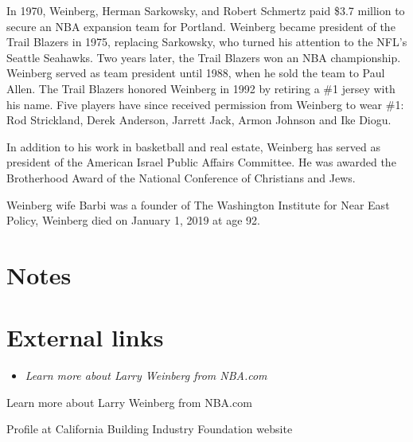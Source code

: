 In 1970, Weinberg, Herman Sarkowsky, and Robert Schmertz paid \$3.7
million to secure an NBA expansion team for Portland. Weinberg became
president of the Trail Blazers in 1975, replacing Sarkowsky, who turned
his attention to the NFL's Seattle Seahawks. Two years later, the Trail
Blazers won an NBA championship. Weinberg served as team president until
1988, when he sold the team to Paul Allen. The Trail Blazers honored
Weinberg in 1992 by retiring a \#1 jersey with his name. Five players
have since received permission from Weinberg to wear \#1: Rod
Strickland, Derek Anderson, Jarrett Jack, Armon Johnson and Ike Diogu.

In addition to his work in basketball and real estate, Weinberg has
served as president of the American Israel Public Affairs Committee. He
was awarded the Brotherhood Award of the National Conference of
Christians and Jews.

Weinberg wife Barbi was a founder of The Washington Institute for Near
East Policy, Weinberg died on January 1, 2019 at age 92.

\section{Notes}\label{notes}

\section{External links}\label{external-links}

\begin{itemize}
\item
  \emph{Learn more about Larry Weinberg from NBA.com}
\end{itemize}

Learn more about Larry Weinberg from NBA.com

Profile at California Building Industry Foundation website
